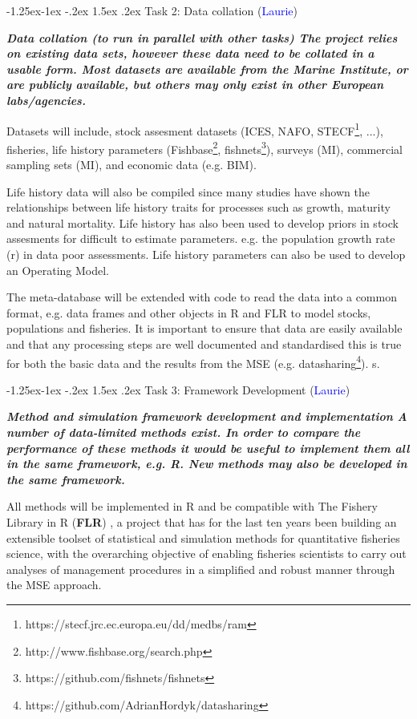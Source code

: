 \documentclass[a4paper, 10pt]{article}
\makeatletter
\newcommand{\laurie}{\textcolor{blue}}
\renewcommand{\subsubsection}{\@startsection{subsubsection}{3}{\z@}%
  {-1.25ex\@plus -1ex \@minus -.2ex}%
  {1.5ex \@plus .2ex}%
  {\normalfont\slshape}}
\makeatother
\begin{document}
\subsubsection{Task 2: Data collation (\laurie{Laurie})}

\textit{\textbf{Data collation (to run in parallel with other tasks) The project relies on existing data sets, however these data need to be collated in a usable form. Most datasets are available from the Marine Institute, or are publicly available, but others may only exist in other European labs/agencies.}}

Datasets will include, stock assesment datasets (ICES, NAFO, STECF\footnote{https://stecf.jrc.ec.europa.eu/dd/medbs/ram}, ...), fisheries, life history parameters (Fishbase\footnote{http://www.fishbase.org/search.php}, fishnets\footnote{https://github.com/fishnets/fishnets}), surveys (MI), commercial sampling sets (MI), and economic data (e.g. BIM).

Life history data will also be compiled since many studies have shown the relationships between life history traits for processes such as growth, maturity and natural mortality. Life history has also been used to develop priors in stock assesments for difficult to estimate parameters. e.g. the population growth rate (r) in data poor assessments. Life history parameters can also be used to develop an Operating Model.

The meta-database will be extended with code to read the data into a common format, e.g. data frames and other objects in R and FLR to model stocks, populations and fisheries. It is important to ensure that data are easily available and that any processing steps are well documented and standardised this is true for both the basic data and the results from the MSE (e.g. datasharing\footnote{https://github.com/AdrianHordyk/datasharing}).
s.


\subsubsection{Task 3: Framework Development (\laurie{Laurie})}

\textit{\textbf{Method and simulation framework development and implementation A number of data-limited methods exist. In order to compare the performance of these methods it would be useful to implement them all in the same framework, e.g. R. New methods may also be developed in the same framework.}}

All methods will be implemented in R and be compatible with The Fishery Library in R (\textbf{FLR})  \citep{kell2007flr}, a project that has for the last ten years been building an extensible toolset of statistical and simulation methods for quantitative fisheries science, with the overarching objective of enabling fisheries scientists to carry out analyses of management procedures in a simplified and robust manner through the MSE approach.
\end{document}
